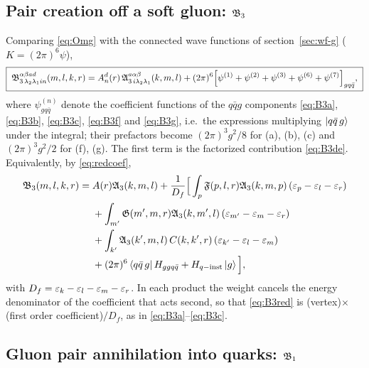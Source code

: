 \subsection{Pair creation off a soft gluon: $\mathfrak{B}_{3}$}

Comparing \eqref{eq:Omg} with the connected wave functions of section~\ref{sec:wf-g}
($K=(2\pi)^{6}\psi$),
\begin{equation}
\boxed{\;
\mathfrak{B}^{\alpha\beta ad}_{3\,\lambda_{2}\lambda_{1}in}(m,l,k,r)=A^{d}_{n}(r)\,\mathfrak{A}^{a\alpha\beta}_{3\,i\lambda_{2}\lambda_{1}}(k,m,l)
+(2\pi)^{6}\Big[\psi^{(1)}+\psi^{(2)}+\psi^{(3)}+\psi^{(6)}+\psi^{(7)}\Big]_{gq\bar q},\;}
\label{eq:B3}
\end{equation}
where $\psi^{(n)}_{gq\bar q}$ denote the coefficient functions of the $q\bar q g$ components
\eqref{eq:B3a}, \eqref{eq:B3b}, \eqref{eq:B3c}, \eqref{eq:B3f} and \eqref{eq:B3g}, i.e.\ the expressions
multiplying $\left|q\bar q\,g\right\rangle$ under the integral; their prefactors become $(2\pi)^{3}g^{2}/8$ for
(a), (b), (c) and $(2\pi)^{3}g^{2}/2$ for (f), (g). The first term is the factorized contribution
\eqref{eq:B3de}. Equivalently, by \eqref{eq:redcoef},
\begin{align}
\mathfrak{B}_{3}(m,l,k,r)=\;&A(r)\mathfrak{A}_{3}(k,m,l)+\frac{1}{D_{f}}\Big[\int_{p}\mathfrak{F}(p,l,r)\mathfrak{A}_{3}(k,m,p)\,(\varepsilon_{p}-\varepsilon_{l}-\varepsilon_{r})
\nonumber\\
&+\int_{m'}\mathfrak{G}(m',m,r)\mathfrak{A}_{3}(k,m',l)\,(\varepsilon_{m'}-\varepsilon_{m}-\varepsilon_{r})
\nonumber\\
&+\int_{k'}\mathfrak{A}_{3}(k',m,l)\,C(k,k',r)\,(\varepsilon_{k'}-\varepsilon_{l}-\varepsilon_{m})
\nonumber\\
&+(2\pi)^{6}\left\langle q\bar q\,g\right|H_{ggq\bar q}+H_{q-{\rm inst}}\left|g\right\rangle\Big],
\label{eq:B3red}
\end{align}
with $D_{f}=\varepsilon_{k}-\varepsilon_{l}-\varepsilon_{m}-\varepsilon_{r}$. In each product the weight cancels the energy
denominator of the coefficient that acts second, so that \eqref{eq:B3red} is (vertex)$\times$(first
order coefficient)$/D_{f}$, as in \eqref{eq:B3a}--\eqref{eq:B3c}.

\subsection{Gluon pair annihilation into quarks: $\mathfrak{B}_{1}$}

